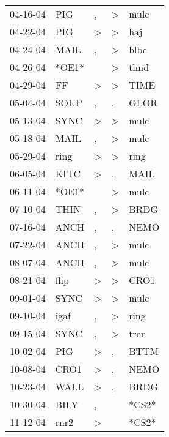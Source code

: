 \begin{supertabular}{lllll}
 04-16-04 &    PIG &                , &     \textgreater &   mulc \\
 04-22-04 &    PIG &     \textgreater &     \textgreater &    haj \\
 04-24-04 &   MAIL &                , &     \textgreater &   blbc \\
 04-26-04 &  *OE1* &                  &     \textgreater &   thnd \\
 04-29-04 &     FF &     \textgreater &     \textgreater &   TIME \\
 05-04-04 &   SOUP &                , &                , &   GLOR \\
 05-13-04 &   SYNC &     \textgreater &     \textgreater &   mulc \\
 05-18-04 &   MAIL &                , &     \textgreater &   mulc \\
 05-29-04 &   ring &     \textgreater &     \textgreater &   ring \\
 06-05-04 &   KITC &     \textgreater &                , &   MAIL \\
 06-11-04 &  *OE1* &                  &     \textgreater &   mulc \\
 07-10-04 &   THIN &                , &     \textgreater &   BRDG \\
 07-16-04 &   ANCH &                , &                , &   NEMO \\
 07-22-04 &   ANCH &                , &     \textgreater &   mulc \\
 08-07-04 &   ANCH &                , &     \textgreater &   mulc \\
 08-21-04 &   flip &     \textgreater &     \textgreater &   CRO1 \\
 09-01-04 &   SYNC &     \textgreater &     \textgreater &   mulc \\
 09-10-04 &   igaf &                , &     \textgreater &   ring \\
 09-15-04 &   SYNC &                , &     \textgreater &   tren \\
 10-02-04 &    PIG &     \textgreater &                , &   BTTM \\
 10-08-04 &   CRO1 &     \textgreater &                , &   NEMO \\
 10-23-04 &   WALL &     \textgreater &                , &   BRDG \\
 10-30-04 &   BILY &                , &                  &  *CS2* \\
 11-12-04 &   rnr2 &     \textgreater &                  &  *CS2* \\

\end{supertabular}
